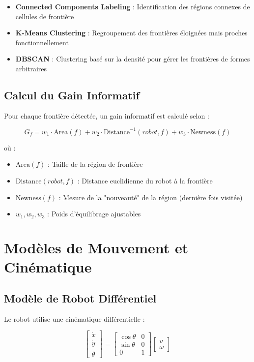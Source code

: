 \documentclass[12pt,a4paper,oneside]{report}
\begin{document}
\begin{itemize}
  \item \textbf{Connected Components Labeling} : Identification des régions connexes de cellules de frontière
  \item \textbf{K-Means Clustering} : Regroupement des frontières éloignées mais proches fonctionnellement
  \item \textbf{DBSCAN} : Clustering basé sur la densité pour gérer les frontières de formes arbitraires
\end{itemize}

\subsection{Calcul du Gain Informatif}

Pour chaque frontière détectée, un gain informatif est calculé selon :

\begin{equation}
G_f = w_1 \cdot \text{Area}(f) + w_2 \cdot \text{Distance}^{-1}(robot, f) + w_3 \cdot \text{Newness}(f)
\end{equation}

où :
\begin{itemize}
  \item $\text{Area}(f)$ : Taille de la région de frontière
  \item $\text{Distance}(robot, f)$ : Distance euclidienne du robot à la frontière
  \item $\text{Newness}(f)$ : Mesure de la "nouveauté" de la région (dernière fois visitée)
  \item $w_1, w_2, w_3$ : Poids d'équilibrage ajustables
\end{itemize}

\section{Modèles de Mouvement et Cinématique}

\subsection{Modèle de Robot Différentiel}

Le robot utilise une cinématique différentielle :

\begin{equation}
\begin{bmatrix} \dot{x} \\ \dot{y} \\ \dot{\theta} \end{bmatrix} = \begin{bmatrix} \cos\theta & 0 \\ \sin\theta & 0 \\ 0 & 1 \end{bmatrix} \begin{bmatrix} v \\ \omega \end{bmatrix}
\end{equation}
\end{document}
